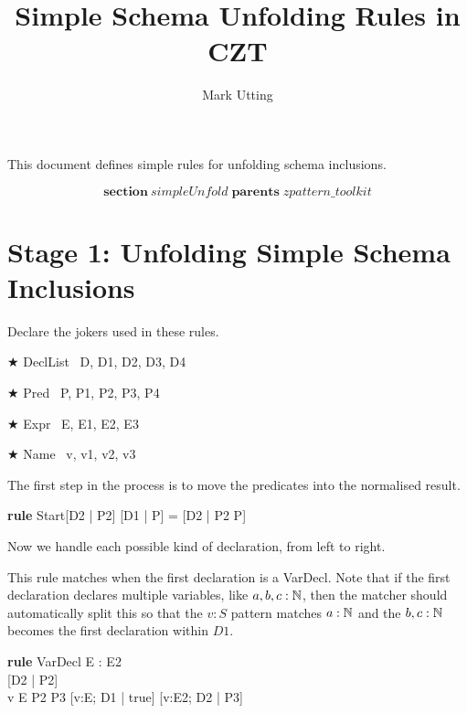 \documentclass{article}
\title{Simple Schema Unfolding Rules in CZT}
\author{Mark Utting}
\newenvironment{zsection}{\[}{\]}
\newcommand{\SECTION}{\textbf{section}~}
\newcommand{\parents}{\mathrel{\textbf{parents}}}
\newenvironment{zedrule}[1]{\par\textbf{rule }#1\vspace{-1ex}\infrule}{\endinfrule}
\newcommand{\derives}{\derive{}}
\newenvironment{zedjoker}[1]{\par$\bigstar$ #1\ }{}
\newcommand{\proviso}{\raisebox{0.5ex}{${}_{\blacktriangleright}\ $}}%
\begin{document}
\maketitle

This document defines simple rules for unfolding schema inclusions.

\begin{zsection}
  \SECTION simpleUnfold \parents zpattern\_toolkit
\end{zsection}

\section*{Stage 1: Unfolding Simple Schema Inclusions}

Declare the jokers used in these rules.

\begin{zedjoker}{DeclList} D, D1, D2, D3, D4 \end{zedjoker} \\
\begin{zedjoker}{Pred} P, P1, P2, P3, P4 \end{zedjoker} \\
\begin{zedjoker}{Expr} E, E1, E2, E3 \end{zedjoker} \\
\begin{zedjoker}{Name} v, v1, v2, v3 \end{zedjoker} \\

\newcommand{\unfoldsTo}{\mathrel{\leadsto}}

The first step in the process is to move the predicates into
the normalised result.
\begin{zedrule}{Start}
   [D1 | true] \unfoldsTo [D2 | P2]
\derives
   [D1 | P] = [D2 | P2 \land P]
\end{zedrule}

Now we handle each possible kind of declaration, from left to right.

This rule matches when the first declaration is a VarDecl.
Note that if the first declaration declares multiple variables,
like $a,b,c:{\mathbb N}$, then the matcher should automatically split this
so that the $v:S$ pattern matches $a:{\mathbb N}$ and the $b,c:{\mathbb N}$
becomes the first declaration within $D1$.
\begin{zedrule}{VarDecl}
   \proviso E : \power E2 \\
   [D1 | true] \unfoldsTo [D2 | P2] \\
   v \in E \land P2 \iff P3
\derives
   [v:E; D1 | true] \unfoldsTo [v:E2; D2 | P3]
\end{zedrule}
\end{document}
